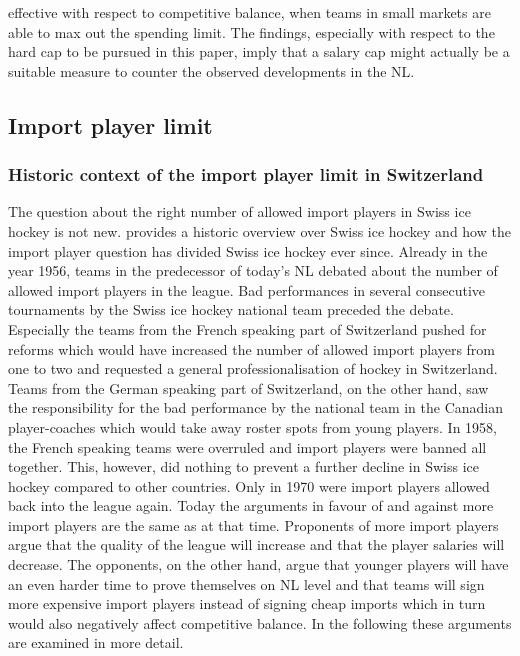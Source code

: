 \documentclass[12pt, a4paper]{article}
\begin{document}
effective with respect to competitive balance, when teams in small markets are able to max out the spending limit. The findings, especially with respect to the hard cap to be pursued in this paper, imply that a salary cap might actually be a suitable measure to counter the observed developments in the NL. 

\subsection{Import player limit}

\subsubsection{Historic context of the import player limit in Switzerland}

The question about the right number of allowed import players in Swiss ice hockey is not new. \citet{koller_kanadier_2016} provides a historic overview over Swiss ice hockey and how the import player question has divided Swiss ice hockey ever since. Already in the year 1956, teams in the predecessor of today’s NL debated about the number of allowed import players in the league. Bad performances in several consecutive tournaments by the Swiss ice hockey national team preceded the debate. Especially the teams from the French speaking part of Switzerland pushed for reforms which would have increased the number of allowed import players from one to two and requested a general professionalisation of hockey in Switzerland. Teams from the German speaking part of Switzerland, on the other hand, saw the responsibility for the bad performance by the national team in the Canadian player-coaches which would take away roster spots from young players. In 1958, the French speaking teams were overruled and import players were banned all together. This, however, did nothing to prevent a further decline in Swiss ice hockey compared to other countries. Only in 1970 were import players allowed back into the league again. Today the arguments in favour of and against more import players are the same as at that time. Proponents of more import players argue that the quality of the league will increase and that the player salaries will decrease. The opponents, on the other hand, argue that younger players will have an even harder time to prove themselves on NL level and that teams will sign more expensive import players instead of signing cheap imports which in turn would also negatively affect competitive balance.  In the following these arguments are examined in more detail. 
\end{document}
